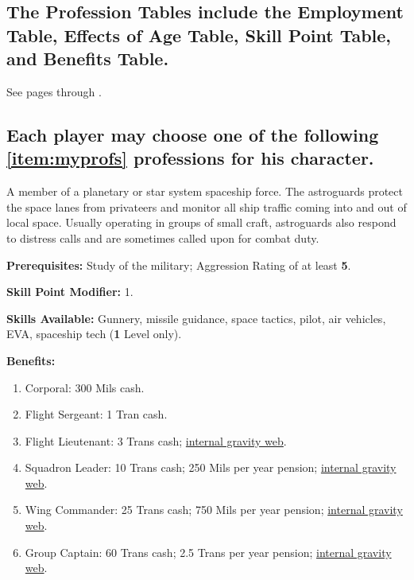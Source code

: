 \subsection[Profession Tables]{The Profession Tables include the
  Employment Table, 
  Effects of Age Table, Skill Point  Table, and Benefits Table.}
\label{sec:prof-tabl-incl}

See pages \pageref{tab:employment} through \pageref{tab:benefits}.


\subsection[Professions]{Each player may choose one of the following
  \ref{item:myprofs}
  professions 
  for his character. }
\label{sec:each-player-may}

\pagebreak[2]

\label{sec:prof-astroguard}

A member of a planetary or star system spaceship force. The
astroguards protect the space lanes from privateers and monitor all
ship traffic coming into and out of local space.  Usually operating in
groups of small craft, astroguards also respond to distress calls and
are sometimes called upon for
combat duty.

\renewcommand{\theenumi}{\textbf{\Alph{enumi}}}
\textbf{Prerequisites:} Study of the military; Aggression Rating of at
least \textbf{5}.

\textbf{Skill Point Modifier:} 1.

\textbf{Skills Available:} Gunnery, missile guidance, space tactics,
pilot, air vehicles, EVA, spaceship tech (\textbf{1} Level only).

\pagebreak[2]
\textbf{Benefits:}
\begin{enumerate}
\item Corporal: 300 Mils cash.
\item Flight Sergeant: 1 Tran cash.
\item Flight Lieutenant: 3 Trans cash; \hyperlink{tag:gravity-web}{internal gravity web}.
\item Squadron Leader: 10 Trans cash; 250 Mils per year pension;
  \hyperlink{tag:gravity-web}{internal gravity web}.
\item Wing Commander: 25 Trans cash; 750 Mils per year  pension;
  \hyperlink{tag:gravity-web}{internal gravity web}.
\item Group Captain: 60 Trans cash; 2.5 Trans per year pension;
  \hyperlink{tag:gravity-web}{internal gravity web}.
\end{enumerate}


